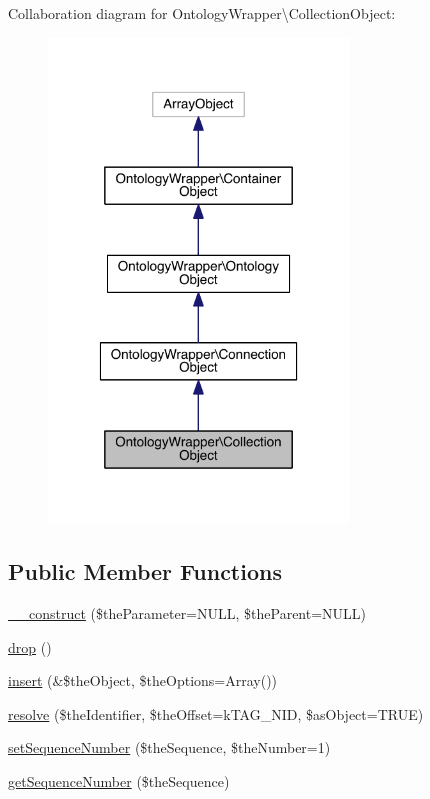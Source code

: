 Collaboration diagram for Ontology\-Wrapper\textbackslash{}Collection\-Object\-:\nopagebreak
\begin{figure}[H]
\begin{center}
\leavevmode
\includegraphics[width=226pt]{class_ontology_wrapper_1_1_collection_object__coll__graph}
\end{center}
\end{figure}
\subsection*{Public Member Functions}
\begin{DoxyCompactItemize}
\item 
\hyperlink{class_ontology_wrapper_1_1_collection_object_a293d59b759d71c809a626cfd5371240f}{\-\_\-\-\_\-construct} (\$the\-Parameter=N\-U\-L\-L, \$the\-Parent=N\-U\-L\-L)
\item 
\hyperlink{class_ontology_wrapper_1_1_collection_object_aee9026b21f08ac0fcfb16f093a9f3235}{drop} ()
\item 
\hyperlink{class_ontology_wrapper_1_1_collection_object_adc0a8dd83621a9d68d005b2858112c74}{insert} (\&\$the\-Object, \$the\-Options=Array())
\item 
\hyperlink{class_ontology_wrapper_1_1_collection_object_a2e6eea553a4b562445ca2959df8d170c}{resolve} (\$the\-Identifier, \$the\-Offset=k\-T\-A\-G\-\_\-\-N\-I\-D, \$as\-Object=T\-R\-U\-E)
\item 
\hyperlink{class_ontology_wrapper_1_1_collection_object_a0868032610dd81c923f4a887ec46104d}{set\-Sequence\-Number} (\$the\-Sequence, \$the\-Number=1)
\item 
\hyperlink{class_ontology_wrapper_1_1_collection_object_a17487ff9e82b493434a074c787262df0}{get\-Sequence\-Number} (\$the\-Sequence)
\end{DoxyCompactItemize}
